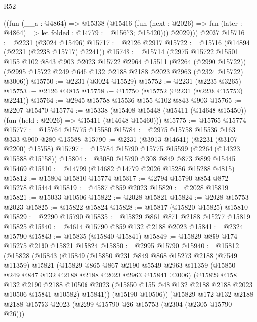 \begin{lexlean}{R52}
\begin{coremodule}
        ((fun (__a : @4864) =>
        @15338
          (@15406
            (fun (next : @2026) => fun (later : @4864) => let folded : @14779 := @15673; @15420)))
          @2029)))
    @2037
@15716 := @2231 (@3024 @15496)
@15717 := @2126 @2917
@15722 := @15716 (@14894 (@2231 (@2238 @15717) @2241))
@15748 := @15714
    (@2975
      @15722
      @15501
      @155
      @102
      @843
      @903
      @2023
      @15722
      @2964
      @15511
      (@2264 (@2990 @15722))
      (@2995 @15722 @249 @645 @132 @2188 @2188 @2023 @2963 (@2324 @15722) @3006))
@15750 := @2231 (@3024 @15529)
@15752 := @2231 (@2235 @3265)
@15753 := @2126 @4815
@15758 := @15750 (@15752 (@2231 (@2238 @15753) @2241))
@15764 := @2945 @15758 @15536 @155 @102 @843 @903
@15765 := @2207 @15470
@15774 := @15338
    (@15408 @15448 (@15411 (@14648 @15450)) (fun (held : @2026) => @15411 (@14648 @15460)))
@15775 := @15765 @15774
@15777 := @15764 @15775 @15580
@15784 := @2975 @15758 @15536 @163 @333 @900 @280 @15588
@15790 := @2231 (@3913 @14641) (@2231 (@3107 @2200) @15758)
@15797 := @15784 @15790 @15775 @15599 (@2264 (@14323 @15588 @15758))
@15804 := @3080 @15790 @308 @849 @873 @899 @15445 @15469
@15810 := @14799 (@14682 @14779 @2026 @15286 @15288 @4815)
@15812 := @15804 @15810 @15774
@15817 := @2794 @15790 @854 @872 @15278 @15444
@15819 := @4587 @859 @2023
@15820 := @2028 @15819
@15821 := @15033 @10506
@15822 := @2028 @15821
@15824 := @2028 @15753 @2023
@15825 := @15822 @15824
@15828 := @15817 (@15820 @15825) @15810
@15829 := @2290 @15790
@15835 := @15829 @861 @871 @2188 @15277 @15819 @15825
@15840 := @4614 @15790 @859 @132 @2188 @2023
@15841 := @2324 @15790
@15843 := @15835 (@15840 @15841)
@15849 := @15829 @869 @174 @15275 @2190 @15821 @15824
@15850 := @2995 @15790
@15940 := @15812
    (@15828
      (@15843
        (@15849
          (@15850
            @231
            @849
            @868
            @15273
            @2188
            (@7549 @11359)
            @15821
            (@15829
              @865
              @867
              @2190
              @5549
              @2963
              @11359
              (@15850 @249 @847 @132 @2188 @2188 @2023 @2963 @15841 @3006)
              (@15829
                @158
                @132
                @2190
                @2188
                @10506
                @2023
                (@15850 @155 @48 @132 @2188 @2188 @2023 @10506 @15841 @10582)
                @15841))
            (@15190 @10506))
          (@15829
            @172
            @132
            @2188
            @2188
            @15753
            @2023
            (@2299 @15790 @26 @15753 (@2304 (@2305 @15790 @26)))

\end{coremodule}
\end{lexlean}
